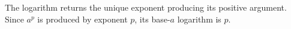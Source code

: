 The logarithm returns the unique exponent producing its positive argument. Since $a^p$ is produced by exponent $p$, its base-$a$ logarithm is $p$.
